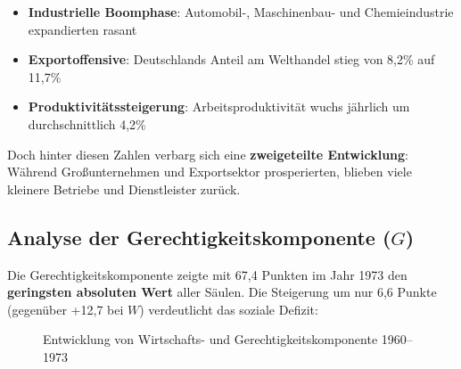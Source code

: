 \begin{itemize}
    \item \textbf{Industrielle Boomphase}: Automobil-, Maschinenbau- und Chemieindustrie expandierten rasant
    \item \textbf{Exportoffensive}: Deutschlands Anteil am Welthandel stieg von 8,2\% auf 11,7\%
    \item \textbf{Produktivitätssteigerung}: Arbeitsproduktivität wuchs jährlich um durchschnittlich 4,2\%
\end{itemize}

Doch hinter diesen Zahlen verbarg sich eine \textbf{zweigeteilte Entwicklung}: Während Großunternehmen und Exportsektor prosperierten, blieben viele kleinere Betriebe und Dienstleister zurück.

\subsection{Analyse der Gerechtigkeitskomponente (\(G\))}

Die Gerechtigkeitskomponente zeigte mit 67,4 Punkten im Jahr 1973 den \textbf{geringsten absoluten Wert} aller Säulen. Die Steigerung um nur 6,6 Punkte (gegenüber +12,7 bei \(W\)) verdeutlicht das soziale Defizit:

\begin{figure}[ht]
    \centering
    \caption{Entwicklung von Wirtschafts- und Gerechtigkeitskomponente 1960–1973}
    \label{fig:entwicklung_w_g}
\end{figure}

